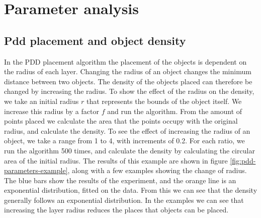 \section{Parameter analysis}



\subsection{Pdd placement and object density}
In the PDD placement algorithm the placement of the objects is dependent on the radius of each layer. Changing the radius of an object changes the minimum distance between two objects. The density of the objects placed can therefore be changed by increasing the radius. To show the effect of the radius on the density, we take an initial radius $r$ that represents the bounds of the object itself. We increase this radius by a factor $f$ and run the algorithm. From the amount of points placed we calculate the area that the points occupy with the original radius, and calculate the density. To see the effect of increasing the radius of an object, we take a range from 1 to 4, with increments of 0.2. For each ratio, we run the algorithm 500 times, and calculate the density by calculating the circular area of the initial radius. The results of this example are shown in figure \ref{fig:pdd-parameters-example}, along with a few examples showing the change of radius. The blue bars show the results of the experiment, and the orange line is an exponential distribution, fitted on the data. From this we can see that the density generally follows an exponential distribution. In the examples we can see that increasing the layer radius reduces the places that objects can be placed. %


